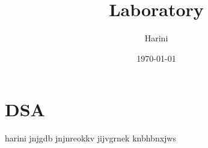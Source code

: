 \documentclass{article}
\title{Laboratory}
\date{\today}
\author{Harini}
\begin{document}
\maketitle

\section{DSA}

harini  jnjgdb jnjnreokkv jijvgrnek knbhbnxjws
\end{document}
